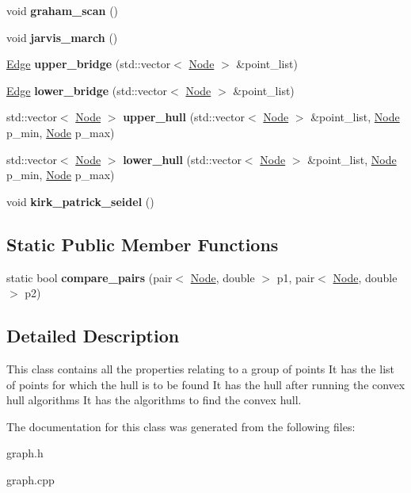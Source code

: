 \begin{DoxyCompactItemize}
void {\bfseries graham\+\_\+scan} ()
\item 
\mbox{\label{classGraph_a3645385ecb98f9082c38facede7b1555}} 
void {\bfseries jarvis\+\_\+march} ()
\item 
\mbox{\label{classGraph_a52305b31ad2a6ad8eb200b9413bed9be}} 
\hyperlink{classEdge}{Edge} {\bfseries upper\+\_\+bridge} (std\+::vector$<$ \hyperlink{classNode}{Node} $>$ \&point\+\_\+list)
\item 
\mbox{\label{classGraph_abb8152da6c3a5ded65c88e33d587bf3f}} 
\hyperlink{classEdge}{Edge} {\bfseries lower\+\_\+bridge} (std\+::vector$<$ \hyperlink{classNode}{Node} $>$ \&point\+\_\+list)
\item 
\mbox{\label{classGraph_a8ba642e6f2e4b781b1e069de0a00cd47}} 
std\+::vector$<$ \hyperlink{classNode}{Node} $>$ {\bfseries upper\+\_\+hull} (std\+::vector$<$ \hyperlink{classNode}{Node} $>$ \&point\+\_\+list, \hyperlink{classNode}{Node} p\+\_\+min, \hyperlink{classNode}{Node} p\+\_\+max)
\item 
\mbox{\label{classGraph_a07f61e4cbf5540ef83bb33b19bc44068}} 
std\+::vector$<$ \hyperlink{classNode}{Node} $>$ {\bfseries lower\+\_\+hull} (std\+::vector$<$ \hyperlink{classNode}{Node} $>$ \&point\+\_\+list, \hyperlink{classNode}{Node} p\+\_\+min, \hyperlink{classNode}{Node} p\+\_\+max)
\item 
\mbox{\label{classGraph_a7b1b09417dc55e2b03e0e06feb6d99cc}} 
void {\bfseries kirk\+\_\+patrick\+\_\+seidel} ()
\end{DoxyCompactItemize}
\subsection*{Static Public Member Functions}
\begin{DoxyCompactItemize}
\item 
\mbox{\label{classGraph_ad0d59e9ffd312e3af8bb37f567da3320}} 
static bool {\bfseries compare\+\_\+pairs} (pair$<$ \hyperlink{classNode}{Node}, double $>$ p1, pair$<$ \hyperlink{classNode}{Node}, double $>$ p2)
\end{DoxyCompactItemize}


\subsection{Detailed Description}
This class contains all the properties relating to a group of points It has the list of points for which the hull is to be found It has the hull after running the convex hull algorithms It has the algorithms to find the convex hull. 

The documentation for this class was generated from the following files\+:\begin{DoxyCompactItemize}
\item 
graph.\+h\item 
graph.\+cpp\end{DoxyCompactItemize}
